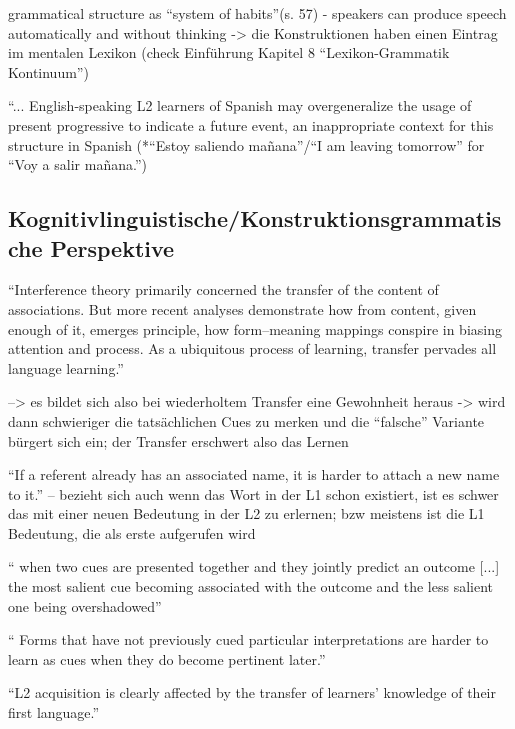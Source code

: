 grammatical structure as ``system of habits''(s. 57) - speakers can produce speech automatically and without thinking -> die Konstruktionen haben einen Eintrag im mentalen Lexikon (check Einführung \cite{Ziem13} Kapitel 8 ``Lexikon-Grammatik Kontinuum'')%



\cite{Braidi99}
``... English-speaking L2 learners of Spanish may overgeneralize the usage of present progressive to indicate a
future event, an inappropriate context for this structure in Spanish (*``Estoy saliendo mañana''/``I am leaving tomorrow''
for ``Voy a salir mañana.'')


\subsection{Kognitivlinguistische/Konstruktionsgrammatische Perspektive}

\cite{Ellis06} ``Interference theory primarily concerned the transfer of the content of
associations. But more recent analyses demonstrate how from content, given
enough of it, emerges principle, how form–meaning mappings conspire in
biasing attention and process. As a ubiquitous process of learning, transfer
pervades all language learning.''

--> es bildet sich also bei wiederholtem Transfer eine Gewohnheit heraus -> wird dann schwieriger die tatsächlichen Cues zu merken und die ``falsche'' Variante bürgert sich ein;
der Transfer erschwert also das Lernen

``If a referent already has an associated name, it is harder to
attach a new name to it.''
-- bezieht sich auch wenn das Wort in der L1 schon existiert, ist es schwer das mit einer neuen Bedeutung in der L2 zu erlernen; bzw meistens ist die L1 Bedeutung, die als erste aufgerufen wird

`` when two cues are presented together and they
jointly predict an outcome [...] the most salient cue becoming associated with the
outcome and the less salient one being overshadowed''

`` Forms that have not
previously cued particular interpretations are harder to learn as cues when
they do become pertinent later.''

``L2 acquisition is clearly affected by the transfer
of learners’ knowledge of their first language.''


